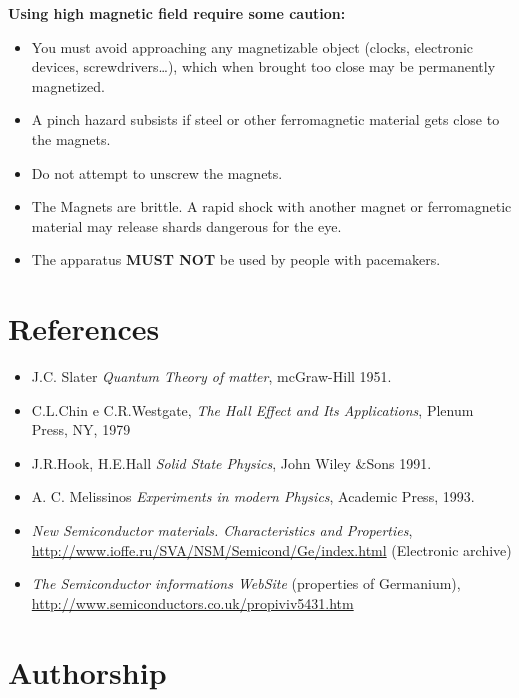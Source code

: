 \documentclass[]{book}
\providecommand{\tightlist}{%
  \setlength{\itemsep}{0pt}\setlength{\parskip}{0pt}}
\begin{document}
\textbf{Using high magnetic field require some caution:}

\begin{itemize}
\item
  You must avoid approaching any magnetizable object (clocks, electronic
  devices, screwdrivers\ldots{}), which when brought too close may be
  permanently magnetized.
\item
  A pinch hazard subsists if steel or other ferromagnetic material gets
  close to the magnets.
\item
  Do not attempt to unscrew the magnets.
\item
  The Magnets are brittle. A rapid shock with another magnet or
  ferromagnetic material may release shards dangerous for the eye.
\item
  The apparatus \textbf{MUST NOT} be used by people with pacemakers.
\end{itemize}

\clearpage

\chapter{References}\label{references}

\begin{itemize}
\tightlist
\item
  J.C. Slater \emph{Quantum Theory of matter}, mcGraw-Hill 1951.
\item
  C.L.Chin e C.R.Westgate, \emph{The Hall Effect and Its Applications},
  Plenum Press, NY, 1979
\item
  J.R.Hook, H.E.Hall \emph{Solid State Physics}, John Wiley \&Sons 1991.
\item
  A. C. Melissinos \emph{Experiments in modern Physics}, Academic Press,
  1993.
\item
  \emph{New Semiconductor materials. Characteristics and Properties},
  \newline \url{http://www.ioffe.ru/SVA/NSM/Semicond/Ge/index.html}
  (Electronic archive)
\item
  \emph{The Semiconductor informations WebSite} (properties of
  Germanium),
  \newline \url{http://www.semiconductors.co.uk/propiviv5431.htm}
\end{itemize}

\chapter{Authorship}\label{authorship}
\end{document}
